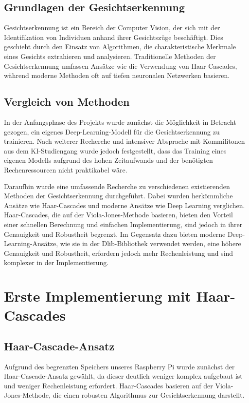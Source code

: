\subsection{Grundlagen der Gesichtserkennung}
Gesichtserkennung ist ein Bereich der Computer Vision, der sich mit der Identifikation von Individuen anhand ihrer Gesichtszüge beschäftigt. Dies geschieht durch den Einsatz von Algorithmen, die charakteristische Merkmale eines Gesichts extrahieren und analysieren. Traditionelle Methoden der Gesichtserkennung umfassen Ansätze wie die Verwendung von Haar-Cascades, während moderne Methoden oft auf tiefen neuronalen Netzwerken basieren.

\subsection{Vergleich von Methoden}
In der Anfangsphase des Projekts wurde zunächst die Möglichkeit in Betracht gezogen, ein eigenes Deep-Learning-Modell für die Gesichtserkennung zu trainieren. Nach weiterer Recherche und intensiver Absprache mit Kommilitonen aus dem KI-Studiengang wurde jedoch festgestellt, dass das Training eines eigenen Modells aufgrund des hohen Zeitaufwands und der benötigten Rechenressourcen nicht praktikabel wäre.

Daraufhin wurde eine umfassende Recherche zu verschiedenen existierenden Methoden der Gesichtserkennung durchgeführt. Dabei wurden herkömmliche Ansätze wie Haar-Cascades und moderne Ansätze wie Deep Learning verglichen. Haar-Cascades, die auf der Viola-Jones-Methode basieren, bieten den Vorteil einer schnellen Berechnung und einfachen Implementierung, sind jedoch in ihrer Genauigkeit und Robustheit begrenzt. Im Gegensatz dazu bieten moderne Deep-Learning-Ansätze, wie sie in der Dlib-Bibliothek verwendet werden, eine höhere Genauigkeit und Robustheit, erfordern jedoch mehr Rechenleistung und sind komplexer in der Implementierung.



\section{Erste Implementierung mit Haar-Cascades}

\subsection{Haar-Cascade-Ansatz}
Aufgrund des begrenzten Speichers unseres Raspberry Pi wurde zunächst der Haar-Cascade-Ansatz gewählt, da dieser deutlich weniger komplex aufgebaut ist und weniger Rechenleistung erfordert. Haar-Cascades basieren auf der Viola-Jones-Methode, die einen robusten Algorithmus zur Gesichtserkennung darstellt. 


